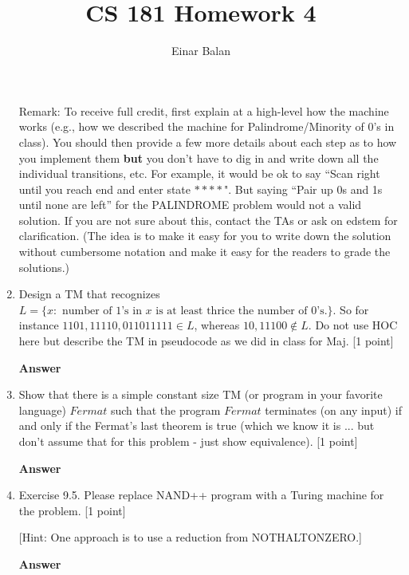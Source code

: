 \documentclass[11pt]{article}
\title{\bf{CS 181 Homework 4}}
\author{ Einar Balan}
\date{}
\newcommand \kw[1]{\textbf{#1}}
\newenvironment{answer}{
\vspace{.5cm}
\begin{mdframed}[]
    \kw{Answer} 
}
{
\end{mdframed}
\pagebreak
}
\begin{document}
\maketitle

\begin{enumerate}
\item[Remark:] To receive full credit, first explain at a high-level how the machine works (e.g., how we described the machine for Palindrome/Minority of 0's in class). You should then provide a few more details about each step as to how you implement them {\bf but} you don't have to dig in and write down all the individual transitions, etc. For example, it would be ok to say ``Scan right until you reach end and enter state $****$". But saying ``Pair up 0s and 1s until none are left'' for the PALINDROME problem would not a valid solution. If you are not sure about this, contact the TAs or ask on edstem for clarification. (The idea is to make it easy for you to write down the solution without cumbersome notation and make it easy for the readers to grade the solutions.)

\item Design a TM that recognizes $L = \{x: \text{ number of $1$'s in $x$ is at least thrice the number of $0$'s.}\}$. So for instance $1101, 11110,011011111 \in L$, whereas $10,11100 \notin L$.  Do not use HOC here but describe the TM in pseudocode as we did in class for Maj. [1 point] 

\begin{answer}

\end{answer}

\item Show that there is a simple constant size TM (or program in your favorite language) $Fermat$ such that the program $Fermat$ terminates (on any input) if and only if the Fermat's last theorem is true (which we know it is ... but don't assume that for this problem - just show equivalence). [1 point]

\begin{answer}

\end{answer}

\item Exercise 9.5. Please replace NAND++ program with a Turing machine for the problem. [1 point]

[Hint: One approach is to use a reduction from NOTHALTONZERO.]

\begin{answer}


\end{answer}
\end{enumerate}
\end{document}
